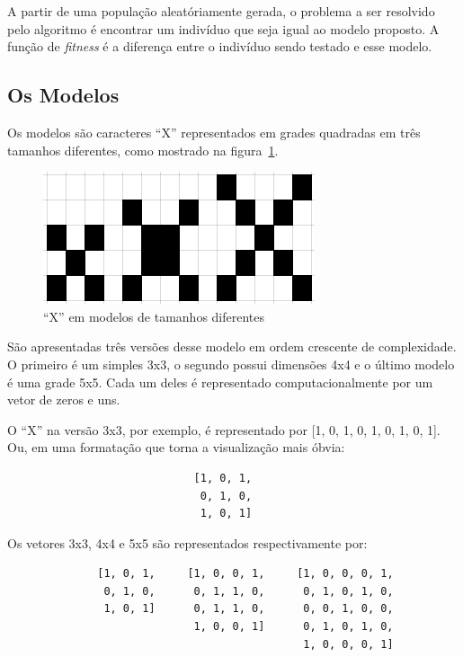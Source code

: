 \documentclass{llncs}
\begin{document}
A partir de uma população aleatóriamente gerada, o problema a ser resolvido pelo algoritmo é encontrar um indivíduo que seja igual ao modelo proposto. A função de \textit{fitness} é a diferença entre o indivíduo sendo testado e esse modelo.

%
\subsection{Os Modelos}
%
Os modelos são caracteres \enquote{X} representados em grades quadradas em três tamanhos diferentes, como mostrado na figura~\ref{fig:xs}.

\begin{figure}[h]
\includegraphics[scale=0.8]{modelo-x}
\centering
\caption{\enquote{X} em modelos de tamanhos diferentes}
\label{fig:xs}
\end{figure}

São apresentadas três versões desse modelo em ordem crescente de complexidade. O primeiro é um simples 3x3, o segundo possui dimensões 4x4 e o último modelo é uma grade 5x5. Cada um deles é representado computacionalmente por um vetor de zeros e uns.

O \enquote{X} na versão 3x3, por exemplo, é representado por [1, 0, 1, 0, 1, 0, 1, 0, 1]. Ou, em uma formatação que torna a visualização mais óbvia:

\begin{verbatim}
                             [1, 0, 1,
                              0, 1, 0,
                              1, 0, 1]
\end{verbatim}

Os vetores 3x3, 4x4 e 5x5 são representados respectivamente por:

\begin{verbatim}
              [1, 0, 1,     [1, 0, 0, 1,     [1, 0, 0, 0, 1,
               0, 1, 0,      0, 1, 1, 0,      0, 1, 0, 1, 0,
               1, 0, 1]      0, 1, 1, 0,      0, 0, 1, 0, 0,
                             1, 0, 0, 1]      0, 1, 0, 1, 0,
                                              1, 0, 0, 0, 1]
\end{verbatim}
\end{document}
